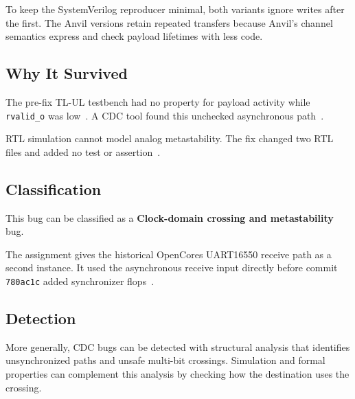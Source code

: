 \documentclass[conference]{IEEEtran}
\begin{document}
To keep the SystemVerilog reproducer minimal, both variants ignore writes after
the first. The Anvil versions retain repeated transfers because Anvil's channel
semantics express and check payload lifetimes with less code.




\subsection{Why It Survived}

The pre-fix TL-UL testbench had no property for payload activity while
\texttt{rvalid\_o} was low~\cite{cdc-parent,tlul-dv}. A CDC tool found this unchecked
asynchronous path~\cite{cdc-issue,cdc-fix}.

RTL simulation cannot model analog metastability. The fix changed two RTL
files and added no test or assertion~\cite{cdc-fix}.




\subsection{Classification}

This bug can be classified as a \textbf{Clock-domain crossing and metastability}
bug.

The assignment gives the historical OpenCores UART16550 receive path
as a second instance. It used the asynchronous receive input directly before
commit \texttt{780ac1c} added synchronizer flops~\cite{uart16550-cdc}.




\subsection{Detection}

More generally, CDC bugs can be detected with structural analysis that
identifies unsynchronized paths and unsafe multi-bit crossings. Simulation and
formal properties can complement this analysis by checking how the destination
uses the crossing.
\end{document}
